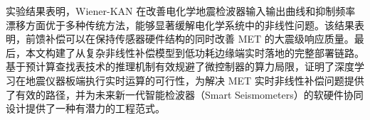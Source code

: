 \documentclass[sn-nature]{sn-jnl}
\begin{document}
实验结果表明，Wiener-KAN 在改善电化学地震检波器输入输出曲线和抑制频率漂移方面优于多种传统方法，能够显著缓解电化学系统中的非线性问题。该结果表明，前馈补偿可以在保持传感器硬件结构的同时改善 MET 的大震级响应质量。最后，本文构建了从复杂非线性补偿模型到低功耗边缘端实时落地的完整部署链路。基于预计算查找表技术的推理机制有效规避了微控制器的算力局限，证明了深度学习在地震仪器板端执行实时运算的可行性，为解决 MET 实时非线性补偿问题提供了有效的路径，并为未来新一代智能检波器（Smart Seismometers）的软硬件协同设计提供了一种有潜力的工程范式。



\FloatBarrier


\end{document}
